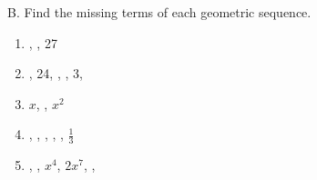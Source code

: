 B. Find the missing terms of each geometric sequence.  

\begin{enumerate}[label = \arabic*. ]
%

\item {}, \blank, 27
\item \hspce \blank, 24, \blank, \blank, 3, \blank
\item \hspce $x$, \blank, $x^{2}$
\item {}, \blank, \blank, \blank, \blank, $\displaystyle \frac{1}{3}$
\item \hspce \blank, \blank, $x^{4}$, $2x^{7}$, \blank, \blank

%
\end{enumerate}
